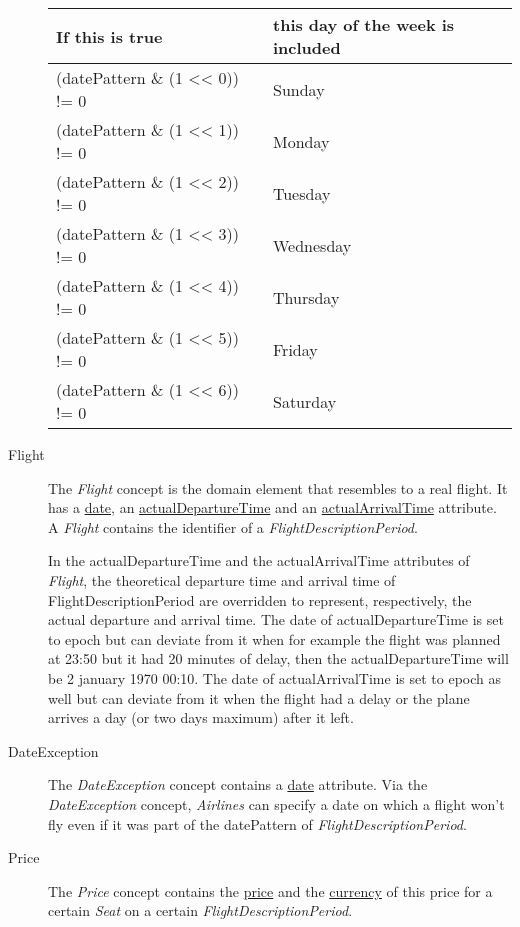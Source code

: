 \documentclass[a4paper,11pt]{article}
\newcommand{\npar}{\par \vspace{2.3ex plus 0.3ex minus 0.3ex} \noindent}
\newcommand{\dsltype}[1]{\textit{#1}}
\newcommand{\dslattr}[1]{\uline{#1}}
\begin{document}
\begin{description}
\begin{center}
\begin{tabular}{l|l}
If this is true & this day of the week is included \\
\hline
(datePattern \& (1 << 0)) != 0 & Sunday \\
(datePattern \& (1 << 1)) != 0 & Monday \\
(datePattern \& (1 << 2)) != 0 & Tuesday \\
(datePattern \& (1 << 3)) != 0 & Wednesday \\
(datePattern \& (1 << 4)) != 0 & Thursday \\
(datePattern \& (1 << 5)) != 0 & Friday \\
(datePattern \& (1 << 6)) != 0 & Saturday \\
\end{tabular}
\end{center}


\item[Flight]
The \dsltype{Flight} concept is the domain element that resembles to a real flight. It has a \dslattr{date}, an \dslattr{actualDepartureTime} and an \dslattr{actualArrivalTime} attribute. A \dsltype{Flight} contains the identifier of a \dsltype{FlightDescriptionPeriod}.

\npar In the actualDepartureTime and the actualArrivalTime attributes of \dsltype{Flight}, the theoretical departure time and arrival time of FlightDescriptionPeriod are overridden to represent, respectively, the actual departure and arrival time. The date of actualDepartureTime is set to epoch but can deviate from it when for example the flight was planned at 23:50 but it had 20 minutes of delay, then the actualDepartureTime will be 2 january 1970 00:10. The date of actualArrivalTime is set to epoch as well but can deviate from it when the flight had a delay or the plane arrives a day (or two days maximum) after it left.

\item[DateException]
The \dsltype{DateException} concept contains a \dslattr{date} attribute. Via the \dsltype{DateException} concept, \dsltype{Airlines} can specify a date on which a flight won’t fly even if it was part of the datePattern of \dsltype{FlightDescriptionPeriod}.

\item[Price]
The \dsltype{Price} concept contains the \dslattr{price} and the \dslattr{currency} of this price for a certain \dsltype{Seat} on a certain \dsltype{FlightDescriptionPeriod}.
\end{description}
\end{document}

